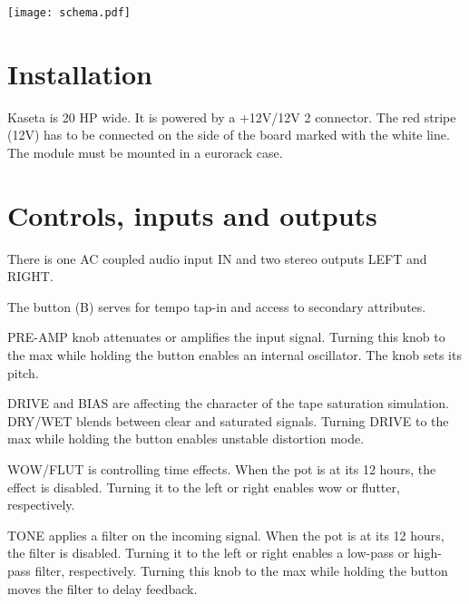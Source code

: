 \documentclass[11pt]{article}
\begin{document}
\begin{minipage}{0.6\textwidth}
\vspace{8mm}

\begin{center}
  \texttt{[image: schema.pdf]}
\end{center}

\end{minipage}

\newpage
\color{black}

\begin{minipage}[t]{0.55\textwidth}
\setlength{\parskip}{6pt}

\section{Installation}

Kaseta is 20 HP wide. It is powered by a +12V/{\textminus}12V 2
connector. The red stripe (\textminus12V) has to be connected on the side of the
board marked with the white line. The module must be mounted in a eurorack case.

\section{Controls, inputs and outputs}

There is one AC coupled audio input IN and two stereo outputs LEFT and RIGHT.

The button (B) serves for tempo tap-in and access to secondary attributes.

PRE-AMP knob attenuates or amplifies the input signal. Turning this knob to the
max while holding the button enables an internal oscillator. The knob sets its
pitch.

DRIVE and BIAS are affecting the character of the tape saturation simulation.
DRY/WET blends between clear and saturated signals. Turning DRIVE to the max
while holding the button enables unstable distortion mode.

WOW/FLUT is controlling time effects. When the pot is at its 12 hours, the
effect is disabled. Turning it to the left or right enables wow or flutter,
respectively.

TONE applies a filter on the incoming signal. When the pot is at its 12 hours,
the filter is disabled. Turning it to the left or right enables a low-pass or
high-pass filter, respectively. Turning this knob to the max while holding the
button moves the filter to delay feedback.


\end{minipage}
\end{document}
